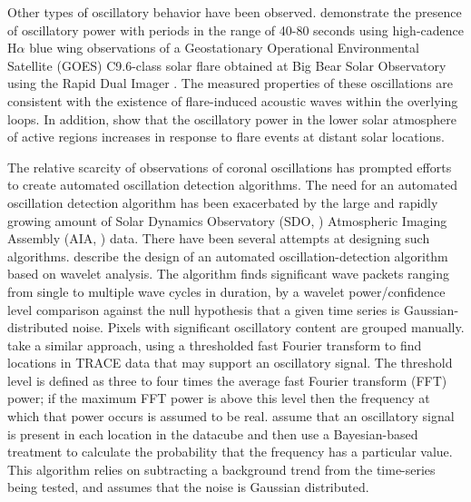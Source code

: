 \documentclass[onecolumn]{emulateapj}
\newcommand{\BF}{ }
\begin{document}
Other types of oscillatory behavior have been observed.
\cite{2005ApJ...620.1101M} demonstrate the presence of oscillatory
power with periods in the range of 40-80 seconds using high-cadence
H$\alpha$ blue wing observations of a Geostationary Operational
Environmental Satellite (GOES) C9.6-class solar flare obtained at Big
Bear Solar Observatory using the Rapid Dual Imager
\citep{2000SoPh..193..259P, 2007A&A...473..943J}. The measured
properties of these oscillations are consistent with the existence of
flare-induced acoustic waves within the overlying loops.  In addition,
\cite{2013ApJ...772...54A} show that the oscillatory power in the
lower solar atmosphere of active regions increases in response to
flare events at distant solar locations.

The relative scarcity of observations of coronal oscillations has
prompted efforts to create automated oscillation detection algorithms.
The need for an automated oscillation detection algorithm has been
exacerbated by the large and rapidly growing amount of {\BF Solar
  Dynamics Observatory (SDO, \citealp{2012SoPh..275....3P})
  Atmospheric Imaging Assembly (AIA, \citealp{2012SoPh..275...17L})}
data.  There have been several attempts at designing such algorithms.
\cite{2004SoPh..223....1D} describe the design of an automated
oscillation-detection algorithm based on wavelet analysis. The
algorithm finds significant wave packets ranging from single to
multiple wave cycles in duration, by a wavelet power/confidence level
comparison against the null hypothesis that a given time series is
Gaussian-distributed noise.  Pixels with significant oscillatory
content are grouped manually.  \cite{2007SoPh..241..397N} take a
similar approach, using a thresholded fast Fourier transform to find
locations in TRACE data that may support an oscillatory signal. The
threshold level is defined as three to four times the average fast
Fourier transform (FFT) power; if the maximum FFT power is above this
level then the frequency at which that power occurs is assumed to be
real. \cite{2010SoPh..264..403I} assume that an oscillatory signal is
present in each location in the datacube and then use a Bayesian-based
treatment to calculate the probability that the frequency has a
particular value.  This algorithm relies on subtracting a background
trend from the time-series being tested, and assumes that the noise is
Gaussian distributed.
\end{document}
